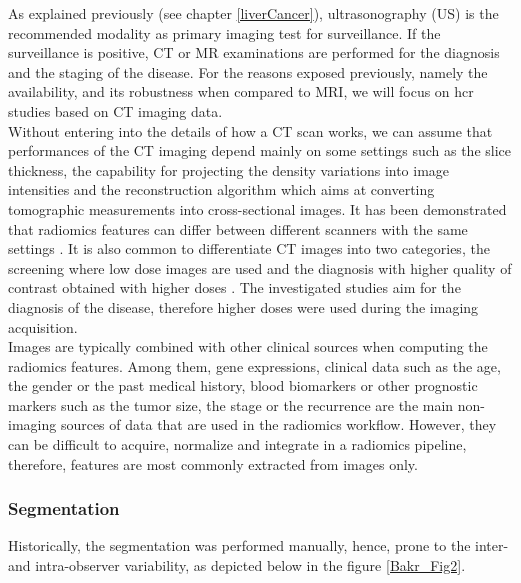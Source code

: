 As explained previously (see chapter \ref{liverCancer}), ultrasonography (US) is the recommended
modality as primary imaging test for surveillance. If the surveillance
is positive, CT or MR examinations are performed for the diagnosis and
the staging of the disease. For the reasons exposed previously, namely
the availability, and its robustness when compared to MRI, we will focus
on \ac{hcr} studies based on CT imaging data.\\
Without entering into the details of how a CT scan works, we can assume
that performances of the CT imaging depend mainly on some settings such
as the slice thickness, the capability for projecting the density
variations into image intensities and the reconstruction algorithm which
aims at converting tomographic measurements into cross-sectional images.
It has been demonstrated that radiomics features can differ between
different scanners with the same settings \cite{Berenguer2018}. 
It is also common to differentiate CT images into two
categories, the screening where low dose images are used and the
diagnosis with higher quality of contrast obtained with 
higher doses \cite{Thawani2018}. The investigated studies aim for the diagnosis of the disease, therefore higher doses were used during the imaging acquisition.\\
Images are typically combined with other clinical sources when computing
the radiomics features. Among them, gene expressions, clinical data such
as the age, the gender or the past medical history, blood biomarkers or
other prognostic markers such as the tumor size, the stage or the
recurrence are the main non-imaging sources of data that are used in the
radiomics workflow. However, they can be difficult to acquire, normalize
and integrate in a radiomics pipeline, therefore, features are most
commonly extracted from images only.

\subsubsection{Segmentation}\label{segmentation}

Historically, the segmentation was performed manually, hence, prone
to the inter- and intra-observer variability, as depicted below in the figure \ref{Bakr_Fig2}.

